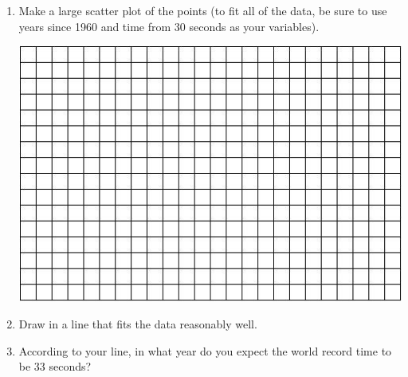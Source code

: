 \documentclass[12pt]{article}
\begin{document}
\begin{enumerate}
\begin{enumerate}
\item Make a large scatter plot of the points (to fit all of the data, be sure to use years since 1960 and time from 30 seconds as your variables). 

\vspace{.1in}
\begin{center}
 {\includegraphics [width = 6in] {../GraphPaper}}
\end{center}
\vspace{.1in}

\item Draw in a line that fits the data reasonably well.
\item  According to your line, in what year do you expect the world record time to be 33 seconds?
\end{enumerate}

\end{enumerate}
\end{document}
